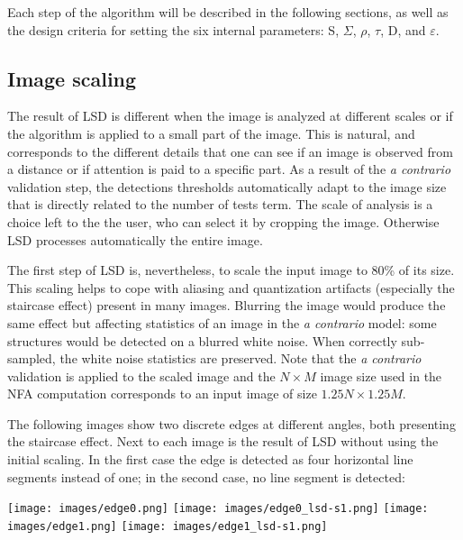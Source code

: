 \documentclass{ipol}
\begin{document}
Each step of the algorithm will be described in the following
sections, as well as the design criteria for setting the six internal
parameters: S, $\Sigma$, $\rho$, $\tau$, D, and
$\varepsilon$.


\subsection{Image scaling}

The result of LSD is different when the image is analyzed at different
scales or if the algorithm is applied to a small part of the
image. This is natural, and corresponds to the different details that
one can see if an image is observed from a distance or if attention is
paid to a specific part. As a result of the \emph{a contrario}
validation step, the detections thresholds automatically adapt to the
image size that is directly related to the number of tests term. The
scale of analysis is a choice left to the the user, who can select it
by cropping the image. Otherwise LSD processes automatically the
entire image.

The first step of LSD is, nevertheless, to scale the input image to
80\% of its size. This scaling helps to cope with aliasing and
quantization artifacts (especially the staircase effect) present in
many images. Blurring the image would produce the same effect but
affecting statistics of an image in the \emph{a contrario} model: some
structures would be detected on a blurred white noise. When correctly
sub-sampled, the white noise statistics are preserved. Note that the
\emph{a contrario} validation is applied to the scaled image and the
$N\times M$ image size used in the NFA computation corresponds to an
input image of size $1.25N\times 1.25M$.

The following images show two discrete edges at different angles, both
presenting the staircase effect. Next to each image is the result of
LSD without using the initial scaling. In the first case the edge is
detected as four horizontal line segments instead of one; in the
second case, no line segment is detected:

\begin{center}
\texttt{[image: images/edge0.png]}
\texttt{[image: images/edge0\_lsd-s1.png]}
\texttt{[image: images/edge1.png]}
\texttt{[image: images/edge1\_lsd-s1.png]}
\end{center}
\end{document}

